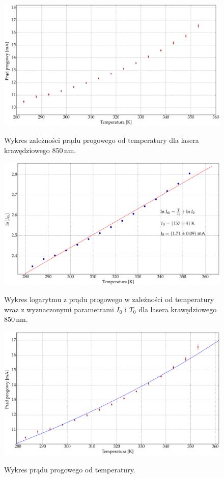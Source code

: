 \documentclass[a4paper, portrait,12pt]{mwrep}
\begin{document}
\begin{figure}
\center
  \includegraphics[scale=0.30]{plot850P010/plot_i_th_error.eps}
  \label{rys1}
  \caption{Wykres zależności prądu progowego od temperatury dla lasera krawędziowego 850\,nm.} 
\end{figure}\begin{figure}
\center
  \includegraphics[scale=0.30]{plot850P010/plot_fit.eps}
  \label{rys1}
  \caption{Wykres logarytmu z prądu progowego w zależności od temperatury wraz z wyznaczonymi parametrami $I_0$ i $T_0$ dla lasera krawędziowego 850\,nm.} 
  \includegraphics[scale=0.30]{plot850P010/plot_exp.eps}
  \label{rys1}
  \caption{Wykres prądu progowego od temperatury.} 
\end{figure}
\end{document}
